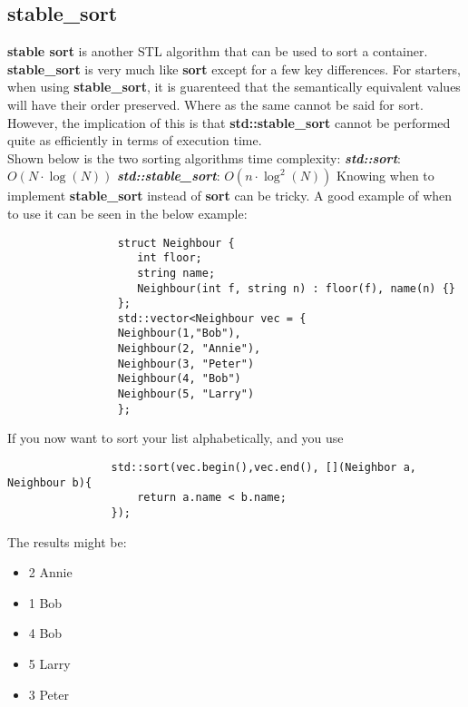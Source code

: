 \documentclass{report}
\begin{document}
                \subsection{stable\_sort}
                \textbf{stable sort} is another STL algorithm that can be used to sort a container. \textbf{stable\_sort} is very much like \textbf{sort} except for a few key differences. For starters, when using \textbf{stable\_sort}, it is guarenteed that the semantically equivalent values will have their order preserved. Where as the same cannot be said for sort. However, the implication of this is that \textbf{std::stable\_sort} cannot be performed quite as efficiently in terms of execution time. \vspace{1.5mm} \\ \noindent Shown below is the two sorting algorithms time complexity:
                \bigbreak \noindent
                \textbf{\textit{std::sort}}: $O(N\cdot \log(N))$
                \bigbreak \noindent
                \textbf{\textit{std::stable\_sort}}: $O(n\cdot\log^2(N))$
                Knowing when to implement \textbf{stable\_sort} instead of \textbf{sort} can be tricky. A good example of when to use it can be seen in the below example:
                \begin{verbatim}
                 struct Neighbour {
                    int floor;
                    string name;
                    Neighbour(int f, string n) : floor(f), name(n) {}
                 };
                 std::vector<Neighbour vec = {
                 Neighbour(1,"Bob"), 
                 Neighbour(2, "Annie"), 
                 Neighbour(3, "Peter")
                 Neighbour(4, "Bob")
                 Neighbour(5, "Larry")
                 };
                \end{verbatim}
                If you now want to sort your list alphabetically, and you use 
                \begin{verbatim}
                std::sort(vec.begin(),vec.end(), [](Neighbor a, Neighbour b){
                    return a.name < b.name;
                });
                \end{verbatim}
                The results might be: 
                \begin{itemize}
                    \item 2 Annie
                    \item 1 Bob
                    \item 4 Bob
                    \item 5 Larry
                    \item 3 Peter
                \end{itemize}
\end{document}
